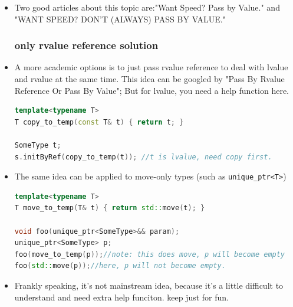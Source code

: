 \documentclass[a4paper,11pt,twoside]{book}
\begin{document}
\begin{itemize}
\item Two good articles about this topic are:"Want Speed? Pass by Value." and "WANT SPEED? DON'T (ALWAYS) PASS BY VALUE."

\subsubsection{only rvalue  reference solution}

    \item A more academic options is to just pass rvalue reference to deal with lvalue and rvalue at the same time. This idea can be googled by "Pass By Rvalue Reference Or Pass By Value"; But for lvalue, you need a help function here.
\begin{lstlisting}[frame=single, language=c++]
template<typename T>
T copy_to_temp(const T& t) { return t; }

SomeType t; 
s.initByRef(copy_to_temp(t)); //t is lvalue, need copy first.
\end{lstlisting}

    \item The same idea can be applied to move-only types (such as \texttt{unique\_ptr<T>})
\begin{lstlisting}[frame=single, language=c++]
template<typename T>
T move_to_temp(T& t) { return std::move(t); }

void foo(unique_ptr<SomeType>&& param);
unique_ptr<SomeType> p;
foo(move_to_temp(p));//note: this does move, p will become empty 
foo(std::move(p));//here, p will not become empty.  
\end{lstlisting}


    \item Frankly speaking, it's not mainstream idea, because it's a little difficult to understand and need extra help funciton. keep just for fun.







\end{itemize}
\end{document}
